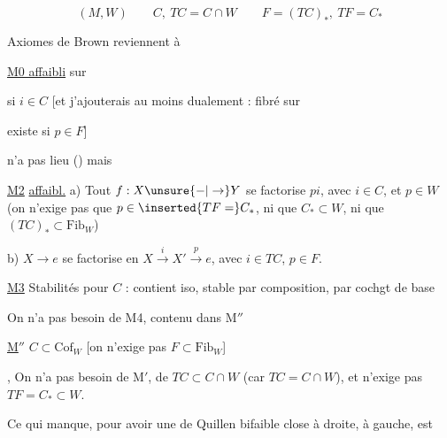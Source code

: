 

\[ (M,W)\qquad C,\ TC=C\cap W\qquad F=(TC)_*,\ TF=C_* \]

Axiomes de Brown reviennent à

\uline{M0 affaibli} \quad {} sur


 si $i\in C$ [et j'ajouterais au moins \unsure{;} dualement :  fibré sur


existe si $p\in F$]

 n'a pas lieu () mais

\uline{M2} \uline{affaibl.} \quad a) Tout $f:X\unsure{-|\to}Y$ se factorise  $pi$, avec $i\in C$, et $p\in W$ (on n'exige pas que $p\in\inserted{TF=}C_*$, ni que $C_*\subset W$, ni que $(TC)_*\subset\mathrm{Fib}_W$)

b) $X\longrightarrow e$ se factorise en $X\xrightarrow{i}X'\xrightarrow{p}e$, avec $i\in TC$, $p\in F$.

\uline{M3} Stabilités pour $C$ : contient iso, stable par composition, par cochgt de base

 On n'a pas besoin de M4, contenu dans M$''$

\uline{M$''$} \quad $C\subset\mathrm{Cof}_W$ [on n'exige pas $F\subset\mathrm{Fib}_W$]

, On n'a pas besoin de M$'$, de $TC\subset C\cap W$ (car $TC=C\cap W$), et  n'exige pas $TF=C_*\subset W$.

Ce qui manque, pour avoir une   de Quillen bifaible close à droite,  à gauche, est


